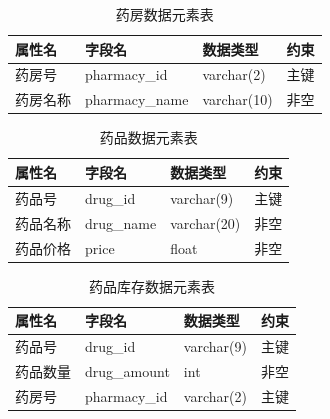 \documentclass{article}
\begin{document}
\begin{table}[H]
    \centering
    \begin{tabularx}{\textwidth}{|>{\raggedright\arraybackslash}X|>{\raggedright\arraybackslash}X|>{\raggedright\arraybackslash}X|>{\raggedright\arraybackslash}X|}
    \toprule
    \textbf{属性名} & \textbf{字段名} & \textbf{数据类型} & \textbf{约束} \\ \midrule
    药房号 & pharmacy\_id & varchar(2) & 主键 \\ \midrule
    药房名称 & pharmacy\_name & varchar(10) & 非空 \\ \bottomrule
    \end{tabularx}
    \caption{药房数据元素表}
    \label{tab:pharmacy_elements}
\end{table}

\begin{table}[H]
    \centering
    \begin{tabularx}{\textwidth}{|>{\raggedright\arraybackslash}X|>{\raggedright\arraybackslash}X|>{\raggedright\arraybackslash}X|>{\raggedright\arraybackslash}X|}
    \toprule
    \textbf{属性名} & \textbf{字段名} & \textbf{数据类型} & \textbf{约束} \\ \midrule
    药品号 & drug\_id & varchar(9) & 主键 \\ \midrule
    药品名称 & drug\_name & varchar(20) & 非空 \\ \midrule
    药品价格 & price & float & 非空 \\ \bottomrule
    \end{tabularx}
    \caption{药品数据元素表}
    \label{tab:drug_elements}
\end{table}

\begin{table}[H]
    \centering
    \begin{tabularx}{\textwidth}{|>{\raggedright\arraybackslash}X|>{\raggedright\arraybackslash}X|>{\raggedright\arraybackslash}X|>{\raggedright\arraybackslash}X|}
    \toprule
    \textbf{属性名} & \textbf{字段名} & \textbf{数据类型} & \textbf{约束} \\ \midrule
    药品号 & drug\_id & varchar(9) & 主键 \\ \midrule
    药品数量 & drug\_amount & int & 非空 \\ \midrule
    药房号 & pharmacy\_id & varchar(2) & 主键 \\ \bottomrule
    \end{tabularx}
    \caption{药品库存数据元素表}
    \label{tab:drug_storage_elements}
\end{table}
\end{document}
